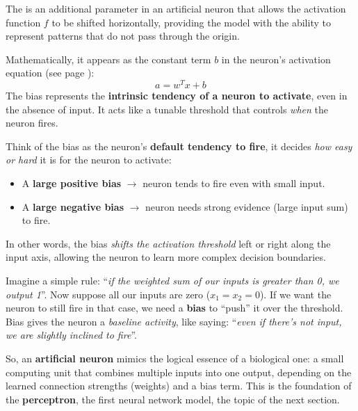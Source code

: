 \begin{definitionbox}[: Bias]
    The  is an additional parameter in an artificial neuron that allows the activation function $f$ to be shifted horizontally, providing the model with the ability to represent patterns that do not pass through the origin.

    \highspace
    Mathematically, it appears as the constant term $b$ in the neuron's activation equation (see page \pageref{def:artificial-neuron}):
    \begin{equation*}
        a = w^T x + b
    \end{equation*}
    The bias represents the \textbf{intrinsic tendency of a neuron to activate}, even in the absence of input. It acts like a tunable threshold that controls \emph{when} the neuron fires.

    \highspace
    Think of the bias as the neuron's \textbf{default tendency to fire}, it decides \emph{how easy or hard} it is for the neuron to activate:
    \begin{itemize}
        \item A \textbf{large positive bias} $\to$ neuron tends to fire even with small input.
        \item A \textbf{large negative bias} $\to$ neuron needs strong evidence (large input sum) to fire.
    \end{itemize}
    In other words, the bias \emph{shifts the activation threshold} left or right along the input axis, allowing the neuron to learn more complex decision boundaries.

    \highspace
    Imagine a simple rule: ``\emph{if the weighted sum of our inputs is greater than 0, we output 1}''. Now suppose all our inputs are zero ($x_1 = x_2 = 0$). If we want the neuron to still fire in that case, we need a \textbf{bias} to ``push'' it over the threshold. Bias gives the neuron a \emph{baseline activity}, like saying: ``\emph{even if there's not input, we are slightly inclined to fire}''.
\end{definitionbox}

\highspace
So, an \textbf{artificial neuron} mimics the logical essence of a biological one: a small computing unit that combines multiple inputs into one output, depending on the learned connection strengths (weights) and a bias term. This is the foundation of the \textbf{perceptron}, the first neural network model, the topic of the next section.